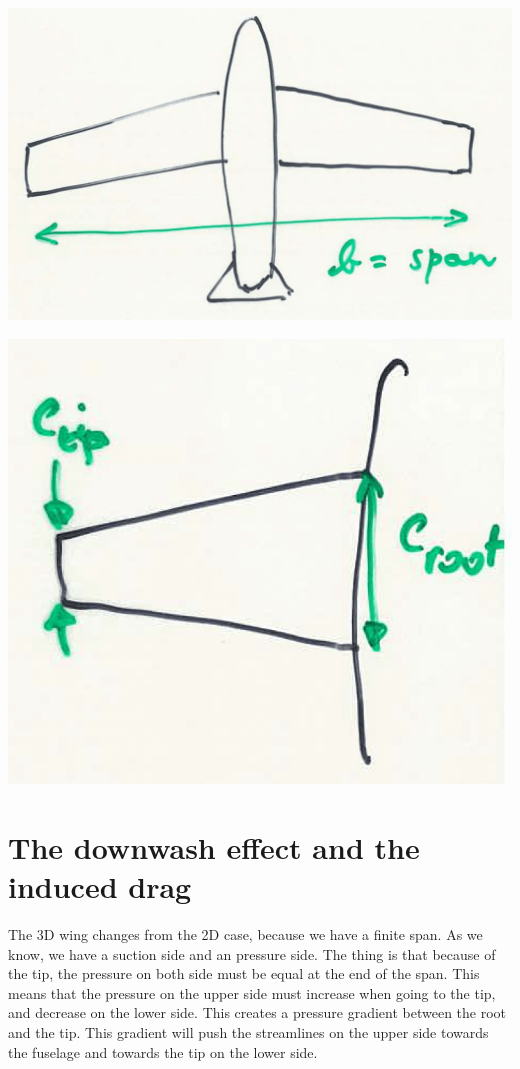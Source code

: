 	\begin{center}
	\begin{minipage}{0.4\textwidth}
	\includegraphics[scale=0.1]{ch3/1}
	\end{minipage}
	\begin{minipage}{0.3\textwidth}
	\includegraphics[scale=0.15]{ch3/2}
	\end{minipage}
	\end{center}
	
\section{The downwash effect and the induced drag}
	The 3D wing changes from the 2D case, because we have a finite span. As we know, we have a suction side and an pressure side. The thing is that because of the tip, the pressure on both side must be equal at the end of the span. This means that the pressure on the upper side must increase when going to the tip, and decrease on the lower side. This creates a pressure gradient between the root and the tip. This gradient will push the streamlines on the upper side towards the fuselage and towards the tip on the lower side. 
	
